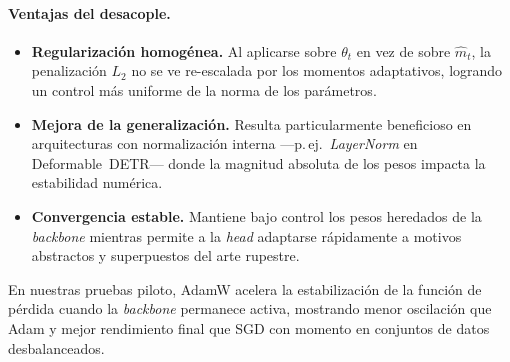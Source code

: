 \paragraph{Ventajas del desacople.}
\begin{itemize}
  \item \textbf{Regularización homogénea.} Al aplicarse sobre \(\theta_t\) en vez de sobre \(\hat{m}_t\), la penalización \(L_2\) no se ve re-escalada por los momentos adaptativos, logrando un control más uniforme de la norma de los parámetros.
  \item \textbf{Mejora de la generalización.} Resulta particularmente beneficioso en arquitecturas con normalización interna —p.\,ej.\ \emph{LayerNorm} en Deformable~DETR— donde la magnitud absoluta de los pesos impacta la estabilidad numérica.
  \item \textbf{Convergencia estable.} Mantiene bajo control los pesos heredados de la \emph{backbone} mientras permite a la \emph{head} adaptarse rápidamente a motivos abstractos y superpuestos del arte rupestre.
\end{itemize}

En nuestras pruebas piloto, AdamW acelera la estabilización de la función de pérdida cuando la \emph{backbone} permanece activa, mostrando menor oscilación que Adam y mejor rendimiento final que SGD con momento en conjuntos de datos desbalanceados.

